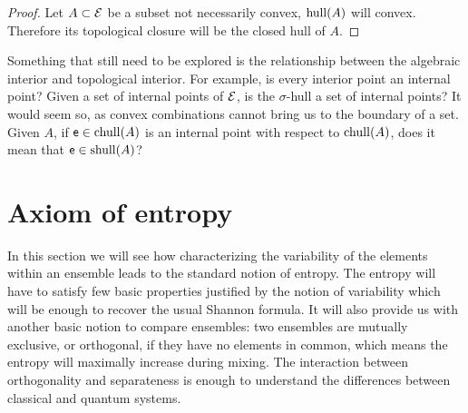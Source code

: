 \begin{mathSection}
\begin{proof}
	Let $A \subset \mathcal{E}$ be a subset not necessarily convex, $\mathrm{hull}(A)$ will convex. Therefore its topological closure will be the closed hull of $A$.
\end{proof}

\end{mathSection}

Something that still need to be explored is the relationship between the algebraic interior and topological interior. For example, is every interior point an internal point? Given a set of internal points of $\mathcal{E}$, is the $\sigma$-hull a set of internal points? It would seem so, as convex combinations cannot bring us to the boundary of a set. Given $A$, if $\mathsf{e} \in \mathrm{chull}(A)$ is an internal point with respect to $\mathrm{chull}(A)$, does it mean that $\mathsf{e} \in \mathrm{shull}(A)$?



\section{Axiom of entropy}

In this section we will see how characterizing the variability of the elements within an ensemble leads to the standard notion of entropy. The entropy will have to satisfy few basic properties justified by the notion of variability which will be enough to recover the usual Shannon formula. It will also provide us with another basic notion to compare ensembles: two ensembles are mutually exclusive, or orthogonal, if they have no elements in common, which means the entropy will maximally increase during mixing. The interaction between orthogonality and separateness is enough to understand the differences between classical and quantum systems.

